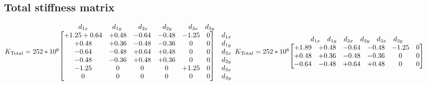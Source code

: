 \documentclass{article}
\begin{document}
\subsection{Total stiffness matrix}
    \begin{math}
        K_{\text{Total}}=252*10^6
        \begin{matrix}
            \begin{matrix}
            \;\;\;\;\;\;\;\;\;\;d_{1x}&\;\;\;\;\;\;\;\;\;d_{1y}& \;\;\;\;\;d_{2x}&\;\;\;\;d_{2y}&\;\;\;\;\;d_{3x}&d_{3y}\\
            \end{matrix}\\
            \begin{bmatrix}
            +1.25+0.64&+0.48&-0.64&-0.48&-1.25&0\\
            +0.48     &+0.36&-0.48&-0.36&0    &0\\
            -0.64     &-0.48&+0.64&+0.48&0    &0\\
            -0.48     &-0.36&+0.48&+0.36&0    &0\\
            -1.25     &0    &0    &0    &+1.25&0\\
            0         &0    &0    &0    &0    &0\\
            \end{bmatrix}&
            \begin{matrix}
            d_{1x}\\
            d_{1y}\\
            d_{2x}\\
            d_{2y}\\
            d_{3x}\\
            d_{3y}\\
            \end{matrix}
        \end{matrix}
        \newline
        K_{\text{Total}}=252*10^6
        \begin{matrix}
            \begin{matrix}
            d_{1x}&d_{1y}&d_{2x}&d_{2y}&d_{3x}&d_{3y}\\
            \end{matrix}\\
            \begin{bmatrix}
            +1.89&+0.48&-0.64&-0.48&-1.25&0\\
            +0.48&+0.36&-0.48&-0.36&0    &0\\
            -0.64&-0.48&+0.64&+0.48&0    &0\\

\end{bmatrix}
\end{matrix}
\end{math}
\end{document}
